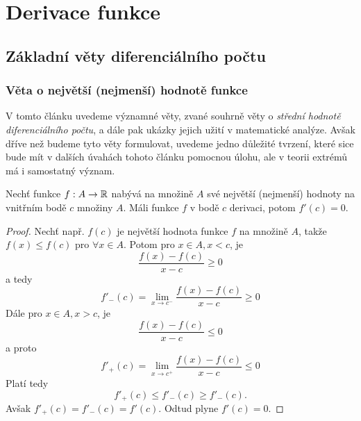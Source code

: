 \chapter{Derivace funkce}
\minitoc
\newpage
  \section{Základní věty diferenciálního počtu}
    \subsection{Věta o největší (nejmenší) hodnotě funkce}
      V tomto článku uvedeme významné věty, zvané souhrně věty o \emph{střední hodnotě diferenciálního počtu}, a dále pak ukázky jejich užití v matematické analýze. 
      Avšak dříve než budeme tyto věty formulovat, uvedeme jedno důležité tvrzení, které sice bude mít v dalších úvahách tohoto článku pomocnou úlohu, ale v teorii 
      extrémů má i samostatný význam. \cite[s.~186]{Brabec1989} 
      \begin{lemma}\label{MA1:lem_diff02}
        Nechť funkce $f:A\rightarrow\mathbb{R}$ nabývá na množině $A$ své největší (nejmenší) hodnoty na vnitřním bodě $c$ množiny $A$. Máli funkce $f$ v bodě $c$ 
        derivaci, potom $f'(c)=0$.  
      \end{lemma}
      \begin{proof}
        Nechť např. $f(c)$ je největší hodnota funkce $f$ na množině $A$, takže $f(x)\leq f(c)$ pro $\forall x\in A$. Potom pro $x\in A, x<c$, je 
        $$\frac{f(x)-f(c)}{x-c}\geq 0$$
        a tedy
        $$f'_{-}(c)=\lim_{x\rightarrow c^-}\frac{f(x)-f(c)}{x-c}\geq0$$ 
        Dále pro $x\in A, x>c$, je
        $$\frac{f(x)-f(c)}{x-c}\leq 0$$ 
        a proto
        $$f'_{+}(c)=\lim_{x\rightarrow c^+}\frac{f(x)-f(c)}{x-c}\leq0$$
        Platí tedy
        $$f'_{+}(c)\leq f'_{-}(c)\geq f'_{-}(c).$$ 
        Avšak $f'_{+}(c)=f'_{-}(c)= f'(c)$. Odtud plyne $f'(c)=0$. 
      \end{proof}
      
